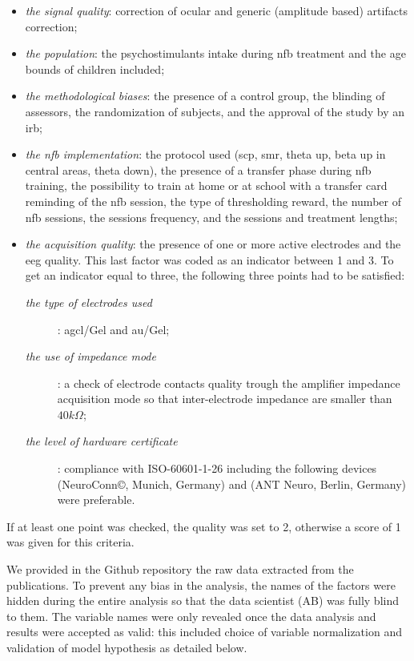 \begin{itemize}
  \item \emph{the signal quality}: correction of ocular and generic (amplitude based) artifacts correction;
  \item \emph{the population}: the psychostimulants intake during \gls{nfb} treatment and the age bounds of children
  included;
  \item \emph{the methodological biases}: the presence of a control group, the blinding of assessors, 
  the randomization of subjects, and the approval of the study by an \gls{irb};
  \item \emph{the \gls{nfb} implementation}: the protocol used (\gls{scp}, \gls{smr}, 
  theta up, beta up in central areas, theta down), the presence of a transfer phase during \gls{nfb} training, the 
	possibility to train at home or at school with a transfer card reminding of the \gls{nfb} session, 
  the type of thresholding reward, the number of \gls{nfb} sessions, the sessions frequency, and the sessions and
  treatment lengths;
  \item \emph{the acquisition quality}: the presence of one or more active electrodes and the \gls{eeg} quality. 
  This last factor was coded as an indicator between 1 and 3. To get an indicator equal to three, the following three  
  points had to be satisfied: 
	\begin{description}
	  \item[\emph{the type of electrodes used}]: \gls{agcl}/Gel and \gls{au}/Gel;
    \item[\emph{the use of impedance mode}]: a check of electrode contacts quality trough the amplifier impedance
     acquisition mode so that inter-electrode impedance are smaller than $40k\Omega$;  
    \item[\emph{the level of hardware certificate}]: compliance with ISO-60601-1-26\cite{} including the following devices 
		\citet{TheraPrax} (NeuroConn\copyright, Munich, Germany) and \citet{Eemagine} (ANT Neuro, Berlin, Germany) were 
		preferable.
	\end{description}
\end{itemize}	
If at least one point was checked, the quality was set to 2, otherwise a score of 1 was given for this criteria.

We provided in the Github repository \citep{Bussalb2018} the raw data extracted from the publications. To prevent any
bias in the analysis, the names of the factors were hidden during the entire analysis so that the data scientist (AB) 
was fully blind to them. The variable names were only revealed once the data  analysis and results were accepted as valid: 
this included choice of variable normalization and validation of model hypothesis as detailed below.

